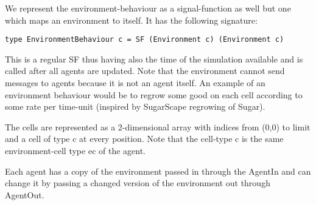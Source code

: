 We represent the environment-behaviour as a signal-function as well but one which maps an environment to itself. It has the following signature:
\begin{lstlisting}[]
type EnvironmentBehaviour c = SF (Environment c) (Environment c)
\end{lstlisting}
This is a regular SF thus having also the time of the simulation available and is called after all agents are updated. Note that the environment cannot send messages to agents because it is not an agent itself. An example of an environment behaviour would be to regrow some good on each cell according to some rate per time-unit (inspired by SugarScape regrowing of Sugar).

The cells are represented as a 2-dimensional array with indices from (0,0) to limit and a cell of type c at every position. Note that the cell-type c is the same environment-cell type ec of the agent.

Each agent has a copy of the environment passed in through the AgentIn and can change it by passing a changed version of the environment out through AgentOut.